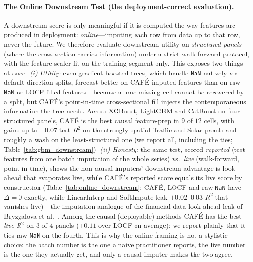 \documentclass[10pt,twocolumn]{article}
\newcommand{\cafe}{CAF\'E}
\begin{document}
\paragraph{The Online Downstream Test (the deployment-correct evaluation).} A
downstream score is only meaningful if it is computed the way features are produced
in deployment: \emph{online}---imputing each row from data up to that row, never the
future. We therefore evaluate downstream utility on \emph{structured panels} (where
the cross-section carries information) under a strict walk-forward protocol, with
the feature scaler fit on the training segment only. This exposes two things at
once. \emph{(i) Utility:} even gradient-boosted trees, which handle \texttt{NaN}
natively via default-direction splits, forecast better on \cafe{}-imputed features
than on raw-\texttt{NaN} or LOCF-filled features---because a lone missing cell
cannot be recovered by a split, but \cafe{}'s point-in-time cross-sectional fill
injects the contemporaneous information the tree needs. Across XGBoost, LightGBM and
CatBoost on four structured panels, \cafe{} is the best causal feature-prep in $9$
of $12$ cells, with gains up to $+0.07$ test $R^2$ on the strongly spatial Traffic
and Solar panels and roughly a wash on the least-structured one (we report all,
including the ties; Table~\ref{tab:gbm_downstream}). \emph{(ii) Honesty:} the same
test, scored \emph{reported} (test features from one batch imputation of the whole
series) vs.\ \emph{live} (walk-forward, point-in-time), shows the non-causal
imputers' downstream advantage is look-ahead that evaporates live, while \cafe{}'s
reported score equals its live score by construction (Table~\ref{tab:online_downstream};
\cafe{}, LOCF and raw-\texttt{NaN} have $\Delta=0$ exactly, while LinearInterp and
SoftImpute leak $+0.02$--$0.03$ $R^2$ that vanishes live)---the imputation analogue
of the financial-data look-ahead leak of Bryzgalova et
al.~\cite{bryzgalova2025missing}. Among the causal (deployable) methods \cafe{} has
the best \emph{live} $R^2$ on $3$ of $4$ panels ($+0.11$ over LOCF on average); we
report plainly that it ties raw-\texttt{NaN} on the fourth. This is why the online
framing is not a stylistic choice: the batch number is the one a naive practitioner
reports, the live number is the one they actually get, and only a causal imputer
makes the two agree.


\end{document}

